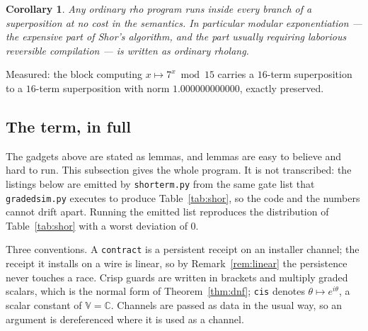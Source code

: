 \documentclass[11pt,a4paper]{article}
\theoremstyle{plain}
\newtheorem{corollary}[theorem]{Corollary}
\theoremstyle{definition}
\theoremstyle{remark}
\newcommand{\V}{\mathbb{V}}
\newcommand{\Cx}{\mathbb{C}}
\begin{document}
\begin{corollary}\label{cor:modexp}
Any ordinary rho program runs inside every branch of a superposition at no cost
in the semantics. In particular modular exponentiation --- the expensive part of
Shor's algorithm, and the part usually requiring laborious reversible
compilation --- is written as ordinary rholang.
\end{corollary}

Measured: the block computing $x \mapsto 7^x \bmod 15$ carries a $16$-term
superposition to a $16$-term superposition with norm $1.000000000000$, exactly
preserved.

\subsection{The term, in full}\label{ssec:fullterm}

The gadgets above are stated as lemmas, and lemmas are easy to believe and hard
to run. This subsection gives the whole program. It is not transcribed: the
listings below are emitted by \texttt{shorterm.py} from the same gate list that
\texttt{gradedsim.py} executes to produce Table~\ref{tab:shor}, so the code and
the numbers cannot drift apart. Running the emitted list reproduces the
distribution of Table~\ref{tab:shor} with a worst deviation of $0$.

Three conventions. A \texttt{contract} is a persistent receipt on an installer
channel; the receipt it installs on a wire is linear, so by
Remark~\ref{rem:linear} the persistence never touches a race. Crisp guards are
written in brackets and multiply graded scalars, which is the normal form of
Theorem~\ref{thm:dnf}; \texttt{cis} denotes $\theta \mapsto e^{i\theta}$, a
scalar constant of $\V = \Cx$. Channels are passed as data in the usual way,
so an argument is dereferenced where it is used as a channel.
\end{document}
